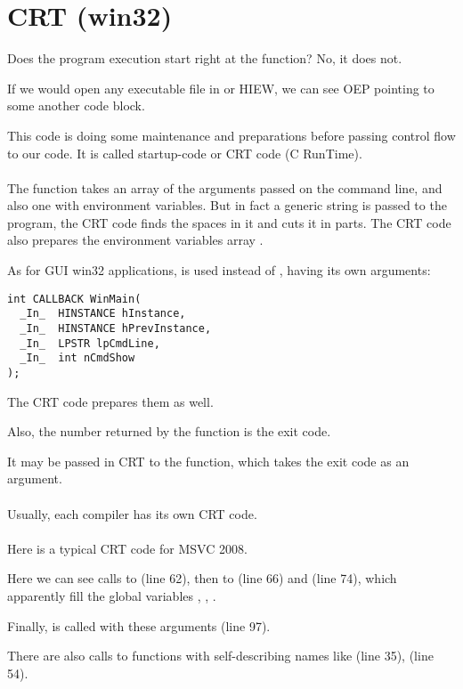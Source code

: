 \section{CRT (win32)}
\label{sec:CRT}

Does the program execution start right at the \main{} function?
No, it does not.

If we would open any executable file in \IDA or HIEW, 
we can see \ac{OEP} pointing to some another code block.

This code is doing some maintenance and preparations before passing control flow to our code.
It is called startup-code or CRT code (C RunTime). \\
\\
The \main{} function takes an array of the arguments passed on the command line, and also
one with environment variables.
But in fact a generic string is passed to the program,
the CRT code finds the spaces in it and cuts it in parts.
The CRT code also prepares the environment
variables array .

As for \ac{GUI} win32 applications,  is used instead of \main{}, having its own arguments:

\begin{lstlisting}
int CALLBACK WinMain(
  _In_  HINSTANCE hInstance,
  _In_  HINSTANCE hPrevInstance,
  _In_  LPSTR lpCmdLine,
  _In_  int nCmdShow
);
\end{lstlisting}

The CRT code prepares them as well.

Also, the number returned by the \main{} function is the exit code.

It may be passed in CRT to the  function, which takes the exit code as an argument. \\
\\
Usually, each compiler has its own CRT code. \\
\\
Here is a typical CRT code for MSVC 2008.



Here we can see calls to  (line 62),
then to  (line 66) and  (line 74),
which apparently fill the global variables
, , .

Finally, \main{} is called with these arguments (line 97).

There are also calls to functions
with self-describing names like  (line 35),  (line 54).

